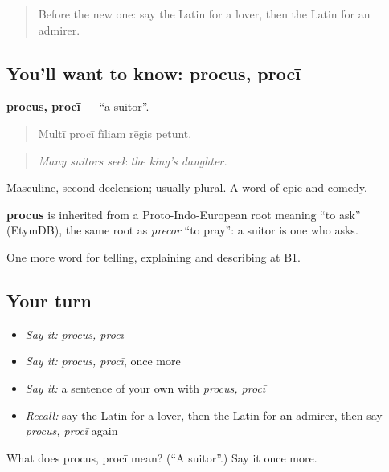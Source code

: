 \label{lesson:LA-C535-procus}



\begin{quote}
Before the new one: say the Latin for a lover, then the Latin for an admirer.
\end{quote}

\subsection*{You'll want to know: procus, procī}
\textbf{procus, procī} — \textquotedblleft{}a suitor\textquotedblright{}.

\begin{quote}
Multī procī fīliam rēgis petunt.
\end{quote}

\begin{quote}
\emph{Many suitors seek the king's daughter.}
\end{quote}

Masculine, second declension; usually plural. A word of epic and comedy.

\begin{cousinweb}
\textbf{procus} is inherited from a Proto-Indo-European root meaning \textquotedblleft{}to ask\textquotedblright{} (EtymDB), the same root as \emph{precor} \textquotedblleft{}to pray\textquotedblright{}: a suitor is one who asks.
\end{cousinweb}

\begin{grammarlens}[title={What you've built}]
One more word for telling, explaining and describing at B1.
\end{grammarlens}

\subsection*{Your turn}
\begin{itemize}
\raggedright
  \item \emph{Say it:} \emph{procus, procī}
  \item \emph{Say it:} \emph{procus, procī}, once more
  \item \emph{Say it:} a sentence of your own with \emph{procus, procī}
  \item \emph{Recall:} say the Latin for a lover, then the Latin for an admirer, then say \emph{procus, procī} again
\end{itemize}

\begin{tcolorbox}[breakable,colback=teal!4,colframe=teal!35!black,title={Before you move on}]
What does procus, procī mean? (\textquotedblleft{}A suitor\textquotedblright{}.) Say it once more.
\end{tcolorbox}
